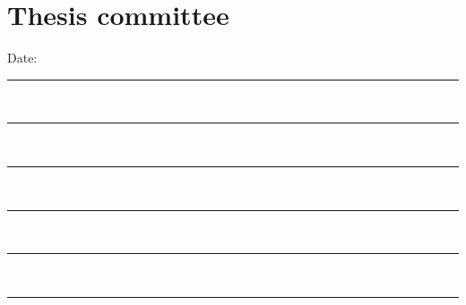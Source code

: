 
\chapter*{Thesis committee}
\vfill
\hfill Date: \graduationDate{} \\
\vspace{15mm}
\rule{\textwidth}{0.3mm} \\
\vspace{15mm}
\rule{\textwidth}{0.3mm} \\
\vspace{15mm}
\rule{\textwidth}{0.3mm} \\
\vspace{15mm}
\rule{\textwidth}{0.3mm} \\
\vspace{15mm}
\rule{\textwidth}{0.3mm} \\
\vspace{15mm}
\rule{\textwidth}{0.3mm} \\
\cleardoublepage
